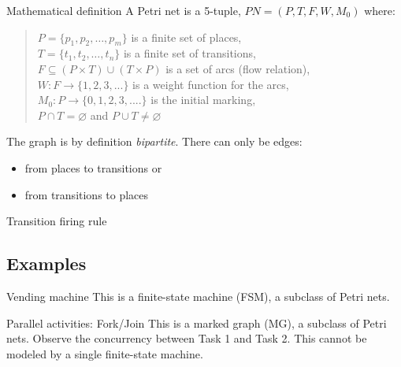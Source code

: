 \documentclass{beamer}
\begin{document}
\begin{frame}{Mathematical definition}
  A Petri net is a 5-tuple, $ PN = (P, T, F, W, M_{0}) $ where:

  \begin{quote}
    $ P = \{ p_1, p_2, \dots, p_m \} $ is a finite set of places,\\
    $ T = \{ t_1, t_2, \dots, t_n \} $ is a finite set of transitions,\\
    $ F \subseteq (P \times T) \cup (T \times P) $ is a set of arcs (flow relation),\\
    $ W: F \rightarrow \{1, 2, 3, ... \} $ is a weight function for the arcs,\\
    $ M_{0}: P \rightarrow \{0, 1, 2, 3, .... \} $ is the initial marking,\\
    $ P \cap T = \varnothing $ and $ P \cup T \neq \varnothing $
  \end{quote}

  \vfill

  The graph is by definition \emph{bipartite}.
  There can only be edges:
  \begin{itemize}
    \item from places to transitions or
    \item from transitions to places
  \end{itemize}

\end{frame}

\begin{frame}{Transition firing rule}
  \begin{figure}[!htb]
    \centering
    
  \end{figure}
\end{frame}

\subsection{Examples}

\begin{frame}{Vending machine}
  \scriptsize
  This is a finite-state machine (FSM), a subclass of Petri nets.

  \begin{figure}
    \centering
    
  \end{figure}
\end{frame}

\begin{frame}{Parallel activities: Fork/Join}
  \scriptsize
  This is a marked graph (MG), a subclass of Petri nets.
  Observe the concurrency between Task 1 and Task 2.
  This cannot be modeled by a single finite-state machine.

  \begin{figure}
    \centering
    
  \end{figure}
\end{frame}
\end{document}
